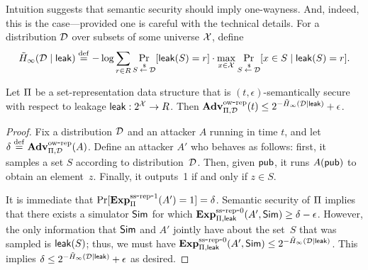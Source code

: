 
Intuition suggests that semantic security should imply one-wayness. And, indeed, this is
the case---provided one is careful with the technical details.
For a distribution ${\cal D}$
over subsets of some universe ${\cal X}$, define
\[\tilde H_\infty({\cal D} \mid {\sf leak}) \stackrel{\rm def}{=} -\log \sum_{r \in R} \Pr_{S {\:\stackrel{{\scriptscriptstyle \hspace{0.2em}\$}} {\leftarrow}\:} {\cal D}}[{\sf leak}(S)=r] \cdot
\max_{x \in {\cal X}} \Pr_{S {\:\stackrel{{\scriptscriptstyle \hspace{0.2em}\$}} {\leftarrow}\:} {\cal D}}[x \in S \mid {\sf leak}(S)=r].\]


\begin{theorem}
Let $\Pi$ be a set-representation data structure that is $(t, \epsilon)$-semantically secure
with respect to leakage ${\sf leak}:2^{\cal X} \rightarrow R$.
Then $\mathrm{\mathbf{Adv}}^{\mathrm{ow\mbox{-}rep}}_{\Pi,\mathcal{D}}(t) \leq 2^{-\tilde H_\infty({\cal D} \mid {\sf leak})} + \epsilon$.
\end{theorem}
\begin{proof}
Fix a distribution ${\cal D}$ and an attacker
$A$ running in time $t$, and let $\delta \stackrel{\rm def}{=} \mathrm{\mathbf{Adv}}^{\mathrm{ow\mbox{-}rep}}_{\Pi,\mathcal{D}}(A)$.
Define an attacker $A'$ who behaves as follows: first, it samples a set $S$ according to
distribution~${\cal D}$. Then, given ${\sf pub}$, it runs $A({\sf pub})$ to obtain an element~$z$.
Finally, it outputs~1 if and only if $z \in S$.

It is immediate that $\Pr[\mathrm{\mathbf{Exp}}^{\mathrm{ss\mbox{-}rep\mbox{-}1}}_{\Pi}(A')=1] = \delta$. Semantic
security of $\Pi$ implies that there exists a simulator ${\sf Sim}$ for which
$\mathrm{\mathbf{Exp}}^{\mathrm{ss\mbox{-}rep\mbox{-}0}}_{\Pi, {\sf leak}}(A', {\sf Sim}) \geq \delta - \epsilon$. However,
the only information
that ${\sf Sim}$
and $A'$ jointly have about the set~$S$ that was sampled is ${\sf leak}(S)$; thus,
we must have $\mathrm{\mathbf{Exp}}^{\mathrm{ss\mbox{-}rep\mbox{-}0}}_{\Pi, {\sf leak}}(A', {\sf Sim}) \leq 2^{-\tilde H_\infty({\cal D} \mid {\sf leak})}$.
This implies
$\delta \leq 2^{-\tilde H_\infty({\cal D} \mid {\sf leak})}+\epsilon$ as desired.
\end{proof}

